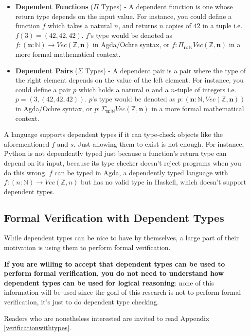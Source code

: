\documentclass[12pt,twoside]{report}
\begin{document}
\begin{itemize}
  \item \textbf{Dependent Functions} ($\Pi$ Types) - A dependent function is one whose return type depends on the input value. For instance, you could define a function $f$ which takes a natural $n$, and returns $n$ copies of $42$ in a tuple i.e. $f(3) = (42, 42, 42)$. $f$'s type would be denoted as $f: (\textbf{n}: \mathbb{N}) \rightarrow Vec(\mathbb{Z}, \textbf{n})$ in Agda/Ochre syntax, or $f: \Pi_{\textbf{n}: \mathbb{N}} Vec(\mathbb{Z}, \textbf{n})$ in a more formal mathematical context.
  \item \textbf{Dependent Pairs} ($\Sigma$ Types) - A dependent pair is a pair where the type of the right element depends on the value of the left element. For instance, you could define a pair $p$ which holds a natural $n$ and a $n$-tuple of integers i.e. $p = (3, (42, 42, 42))$. $p$'s type would be denoted as $p: (\textbf{n}: \mathbb{N}, Vec(\mathbb{Z}, \textbf{n}))$ in Agda/Ochre syntax, or $p: \Sigma_{\textbf{n}: \mathbb{N}} Vec(\mathbb{Z}, \textbf{n})$ in a more formal mathematical context.
\end{itemize}

A language supports dependent types if it can type-check objects like the aforementioned $f$ and $s$. Just allowing them to exist is not enough. For instance, Python is not dependently typed just because a function's return type can depend on its input, because its type checker doesn't reject programs when you do this wrong. $f$ can be typed in Agda, a dependently typed language with $f: (n: \mathbb{N}) \rightarrow Vec(\mathbb{Z}, n)$ but has no valid type in Haskell, which doesn't support dependent types.

\subsection{Formal Verification with Dependent Types}
While dependent types can be nice to have by themselves, a large part of their motivation is using them to perform formal verification.

\textbf{If you are willing to accept that dependent types can be used to perform formal verification, you do not need to understand how dependent types can be used for logical reasoning}: none of this information will be used since the goal of this research is not to perform formal verification, it's just to do dependent type checking.

Readers who are nonetheless interested are invited to read Appendix \ref{verificationwithtypes}.
\end{document}
